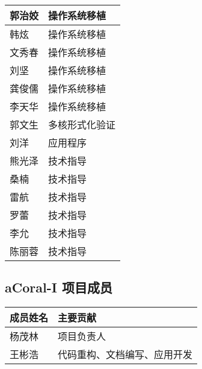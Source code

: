 \begin{center}
\begin{longtable}{|p{12em}<{\centering}|p{17em}<{\centering}|}
        \hline  郭治姣 & 操作系统移植 \\
        \hline  韩炫 & 操作系统移植 \\
        \hline  文秀春 & 操作系统移植 \\
        \hline  刘坚 & 操作系统移植 \\
        \hline  龚俊儒 & 操作系统移植 \\
        \hline  李天华 & 操作系统移植 \\
        \hline  郭文生 & 多核形式化验证 \\
        \hline  刘洋 & 应用程序 \\
        \hline  熊光泽 & 技术指导 \\
        \hline  桑楠 & 技术指导 \\
        \hline  雷航 & 技术指导 \\
        \hline  罗蕾 & 技术指导 \\
        \hline  李允 & 技术指导 \\
        \hline  陈丽蓉 & 技术指导 \\
        \hline
    \end{longtable}
\end{center}

\subsection{aCoral-I 项目成员}
\begin{center}
    \setlength\tabcolsep{2pt}
    \begin{tabular}{|p{12em}<{\centering}|p{17em}<{\centering}|}
        \hline  成员姓名 & 主要贡献 \\
        \hline  杨茂林 & 项目负责人\\
        \hline  王彬浩 & 代码重构、文档编写、应用开发\\
        \hline
    \end{tabular}
\end{center}